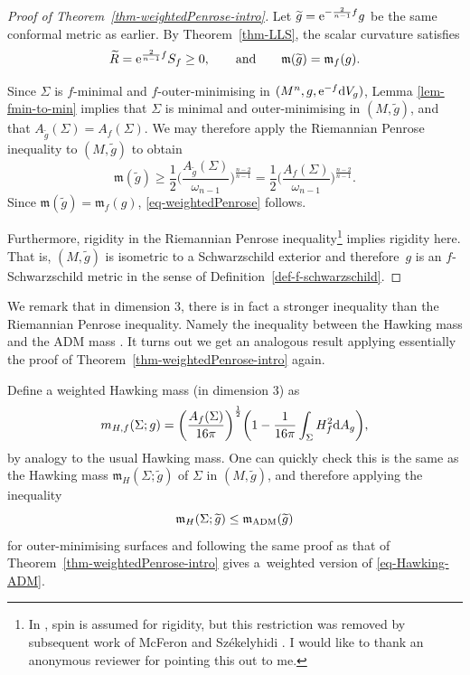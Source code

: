 \documentclass[10pt,a4paper]{amsart}
\numberwithin{equation}{section}
\theoremstyle{definition}
\begin{document}
\begin{proof}[Proof of Theorem~\ref{thm-weightedPenrose-intro}]
	Let $\widetilde g={\rm e}^{-\frac{2}{n-1}f}g$ be the same conformal metric as earlier.
	By Theorem~\ref{thm-LLS}, the scalar curvature satisfies
	\[
	\widetilde R = {\rm e}^{\frac{2}{n-1}f}S_f\geq0,
	\qquad \text{and} \qquad
	\mathfrak{m}(\widetilde g)=\mathfrak{m}_f(g).
	\]
	
	Since $\Sigma$ is $f$-minimal and $f$-outer-minimising in $(M^n,g,{\rm e}^{-f} {\rm d}V_g)$, Lemma \ref{lem-fmin-to-min} implies that
	$\Sigma$ is minimal and outer-minimising in $(M,\widetilde g)$, and that $A_{\widetilde g}(\Sigma)=A_f(\Sigma)$.
	We may therefore apply the Riemannian Penrose inequality \cite{Bray01,BrayLee09, HuiskenIlmanen01} to $(M,\widetilde g)$ to obtain
	\[
	\mathfrak{m}(\widetilde g) \ge \frac12\biggl(\frac{A_{\widetilde g}(\Sigma)}{\omega_{n-1}}\biggr)^{\frac{n-2}{n-1}}
	=\frac12\biggl(\frac{A_f(\Sigma)}{\omega_{n-1}}\biggr)^{\frac{n-2}{n-1}}.
	\]
	Since $\mathfrak{m}(\widetilde g)=\mathfrak{m}_f(g)$, \eqref{eq-weightedPenrose} follows.
	
	Furthermore, rigidity in the Riemannian Penrose inequality\footnote{In \cite{BrayLee09}, spin is assumed for rigidity, but this restriction was removed by subsequent work of McFeron and Sz{\'e}kelyhidi \cite{mcferon2012positive}. I would like to thank an anonymous reviewer for pointing this out to me.} implies rigidity here. That is, $(M,\widetilde g)$ is isometric to a Schwarzschild exterior and therefore~$g$ is an $f$-Schwarzschild metric in the sense of Definition~\ref{def-f-schwarzschild}.
\end{proof}


We remark that in dimension $3$, there is in fact a stronger inequality than the Riemannian Penrose inequality. Namely the inequality between the Hawking mass and the ADM mass \cite{HuiskenIlmanen01}. It turns out we get an analogous result applying essentially the proof of Theorem~\ref{thm-weightedPenrose-intro} again.

Define a weighted Hawking mass (in dimension $3$) as
\begin{equation}\label{eq-weighted-hawking-formula}
	m_{H,f}(\Sigma;g)
	=\biggl(\frac{A_f(\Sigma)}{16\pi}\biggr)^{\frac12}
	\biggl(1-\frac{1}{16\pi}\int_\Sigma H_f^{ 2} {\rm d}A_g\biggr),
\end{equation}
by analogy to the usual Hawking mass. One can quickly check this is the same as the Hawking mass $\mathfrak{m}_H(\Sigma;\widetilde g)$ of $\Sigma$ in $(M,\widetilde g)$, and therefore applying the inequality
\begin{equation}\label{eq-Hawking-ADM}
	\mathfrak{m}_H(\Sigma;\widetilde g)\leq \mathfrak{m}_{\rm ADM}(\widetilde g)
\end{equation}
for outer-minimising surfaces \cite{HuiskenIlmanen01} and following the same proof as that of Theorem~\ref{thm-weightedPenrose-intro} gives a~weighted version of \eqref{eq-Hawking-ADM}.
\end{document}
